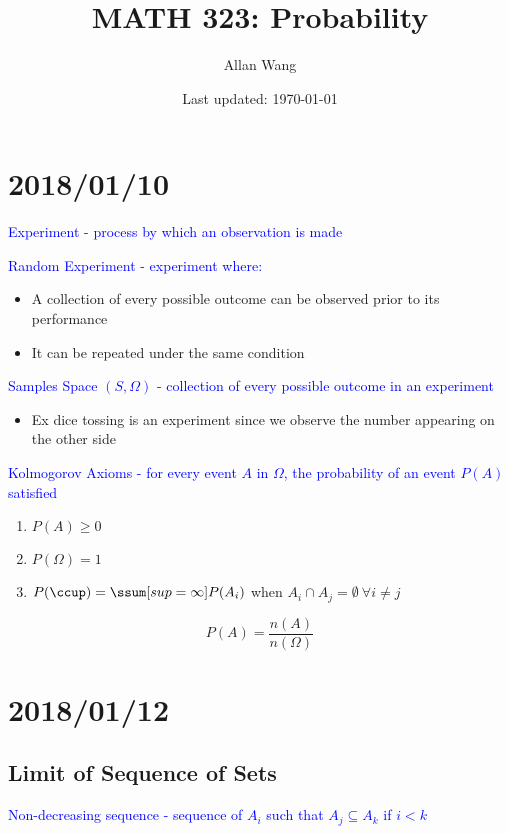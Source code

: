\documentclass[12pt]{article}
\author{Allan Wang}
\date{Last updated: \today}
\title{MATH 323: Probability}
\newcommand{\ddef}[1]{\textcolor{blue}{#1}}
\begin{document}
\onehalfspacing
\maketitle
\tableofcontents
\pagebreak
\section{2018/01/10}

\ddef{Experiment - process by which an observation is made}

\ddef{Random Experiment - experiment where:}

\begin{itemize}
	\item A collection of every possible outcome can be observed prior to its performance
	\item It can be repeated under the same condition
\end{itemize}

\ddef{Samples Space $(S, \Omega)$ - collection of every possible outcome in an experiment}

\begin{itemize}
    \item Ex dice tossing is an experiment since we observe the number appearing on the other side
\end{itemize}

\ddef{Kolmogorov Axioms - for every event $A$ in $\Omega$, the probability of an event $P(A)$ satisfied}

\begin{enumerate}
	\item $P(A) \ge 0$
	\item $P(\Omega) = 1$
	\item $P(\ccup) = \ssum[sup=\infty] P(A_i)$ when $A_i \cap A_j = \emptyset \ \forall i \ne j$
\end{enumerate}

$$P(A) = \frac{n(A)}{n(\Omega)}$$

\section{2018/01/12}

\subsection{Limit of Sequence of Sets}

\ddef{Non-decreasing sequence - sequence of \(A_i\) such that \(A_j \subseteq A_k\) if \(i < k\)}
\end{document}

